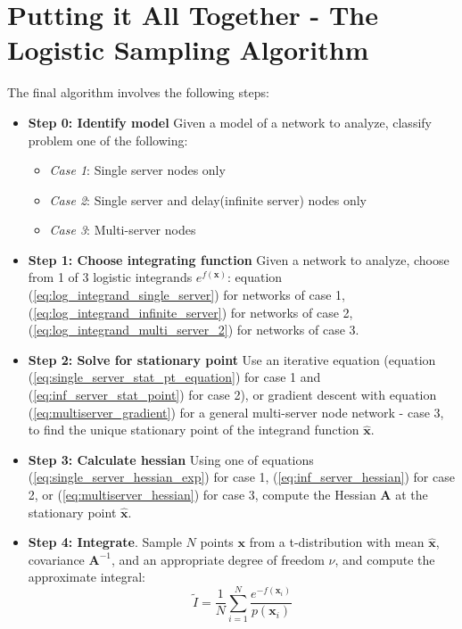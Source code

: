 \section{Putting it All Together - The Logistic Sampling Algorithm} \label{sec:put_all_together}
The final algorithm involves the following steps:
\begin{itemize}
    
    \item \textbf{Step 0: Identify model} Given a model of a network to analyze, classify problem one of the following:
        \begin{itemize}
            \item \textit{Case 1}: Single server nodes only
            \item \textit{Case 2}: Single server and delay(infinite server) nodes only
            \item \textit{Case 3}: Multi-server nodes
        \end{itemize}
    
    \item \textbf{Step 1: Choose integrating function} Given a network to analyze, choose from 1 of 3 logistic integrands \(e^{f(\mathbf{x})}\): equation (\ref{eq:log_integrand_single_server}) for networks of case 1, (\ref{eq:log_integrand_infinite_server}) for networks of case 2, 
    (\ref{eq:log_integrand_multi_server_2}) for networks of case 3.
    
    \item \textbf{Step 2: Solve for stationary point} Use an iterative equation (equation (\ref{eq:single_server_stat_pt_equation}) for case 1 and (\ref{eq:inf_server_stat_point}) for case 2), or gradient descent with equation (\ref{eq:multiserver_gradient}) for a general multi-server node network  - case 3, to find the unique stationary point of the integrand function \(\mathbf{\hat{x}}\).
    
    \item \textbf{Step 3: Calculate hessian} Using one of equations (\ref{eq:single_server_hessian_exp}) for case 1, (\ref{eq:inf_server_hessian}) for case 2, or (\ref{eq:multiserver_hessian}) for case 3, compute the Hessian \(\mathbf{A}\) at the stationary point \(\mathbf{\hat{x}}\).
    
    \item \textbf{Step 4: Integrate}. Sample \(N\) points \(\mathbf{x}\) from a t-distribution with mean \(\mathbf{\hat{x}}\), covariance \(\mathbf{A}^{-1}\), and an appropriate degree of freedom \(\nu\), and compute the approximate integral:
    \[\tilde{I} = \frac{1}{N} \sum_{i=1}^N \frac{e^{-f(\mathbf{x}_i)}}{p(\mathbf{x}_i)} \]
    
\end{itemize}
